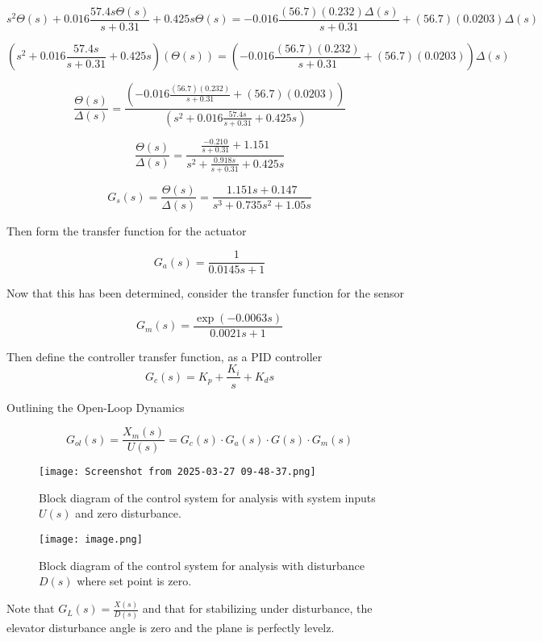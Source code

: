 \documentclass{article}
\begin{document}
\[
s^2\Theta(s) + 0.016\frac{57.4s\Theta(s)}{s + 0.31}  + 0.425s\Theta(s) = -0.016\frac{(56.7)(0.232)\Delta(s)}{s + 0.31} +(56.7)(0.0203)\Delta(s)
\]

\[
(s^2 + 0.016\frac{57.4s}{s + 0.31}  + 0.425s)(\Theta(s)) = (-0.016\frac{(56.7)(0.232)}{s + 0.31} +(56.7)(0.0203))\Delta(s)
\]

\[
\frac{\Theta(s)}{\Delta(s)} = \frac{(-0.016\frac{(56.7)(0.232)}{s + 0.31} +(56.7)(0.0203))}{(s^2 + 0.016\frac{57.4s}{s + 0.31}  + 0.425s)}
\]

\[
\frac{\Theta(s)}{\Delta(s)} = \frac{\frac{-0.210}{s + 0.31} + 1.151}{s^2 + \frac{0.918s}{s + 0.31}  + 0.425s}
\]

\[
G_s(s) = \frac{\Theta(s)}{\Delta(s)} = \frac{1.151s + 0.147}{s^3 + 0.735s^2 + 1.05s}
\]

\vspace{65mm}

Then form the transfer function for the actuator

\vspace{5mm}

\[
G_a(s) = \frac{1}{0.0145s + 1}
\]
\vspace{5mm}

Now that this has been determined, consider the transfer function for the sensor

\[G_m(s) = \frac{\exp(-0.0063s)}{0.0021s + 1}\]


\vspace{5mm}

Then define the controller transfer function, as a PID controller 
\[
G_c(s) = K_p + \frac{K_i}{s} + K_d s
\]

\vspace{5mm}


Outlining the Open-Loop Dynamics

\[
G_{ol}(s) = \frac{X_m(s)}{U(s)} = G_c(s) \cdot G_a(s) \cdot G(s) \cdot G_m(s)
\]

\vspace{5mm}



\begin{figure}[h]
    \centering
    \texttt{[image: Screenshot from 2025-03-27 09-48-37.png]}
    \caption{Block diagram of the control system for analysis with system inputs $U(s)$ and zero disturbance.}
    \label{fig:enter-label}
\end{figure}


\vspace{55mm}

\begin{figure}[h]
    \centering
    \texttt{[image: image.png]}
    \caption{Block diagram of the control system for analysis with disturbance $D(s)$ where set point is zero.}
    \label{fig:enter-label}
\end{figure}

Note that $G_L(s) = \frac{X(s)}{D(s)}$ and that for stabilizing under disturbance, the elevator disturbance angle is zero and the plane is perfectly levelz.
\end{document}
